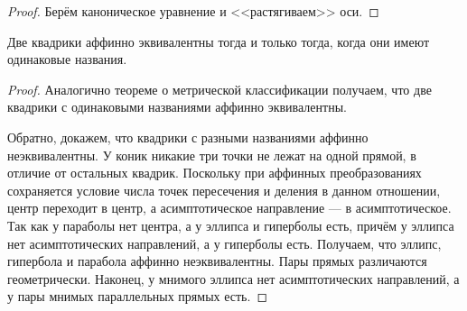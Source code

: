 \begin{proof}
    Берём каноническое уравнение и <<растягиваем>> оси.
\end{proof}

\begin{theorem}
    Две квадрики аффинно эквивалентны тогда и только тогда, когда они имеют одинаковые названия.
\end{theorem}

\begin{proof}
    Аналогично теореме о метрической классификации получаем, что две квадрики с одинаковыми названиями аффинно эквивалентны.

    Обратно, докажем, что квадрики с разными названиями аффинно неэквивалентны. У коник никакие три точки не лежат на одной прямой, в отличие от остальных квадрик. Поскольку при аффинных преобразованиях сохраняется условие числа точек пересечения и деления в данном отношении, центр переходит в центр, а асимптотическое направление --- в асимптотическое. Так как у параболы нет центра, а у эллипса и гиперболы есть, причём у эллипса нет асимптотических направлений, а у гиперболы есть. Получаем, что эллипс, гипербола и парабола аффинно неэквивалентны. Пары прямых различаются геометрически. Наконец, у мнимого эллипса нет асимптотических направлений, а у пары мнимых параллельных прямых есть.
\end{proof}


